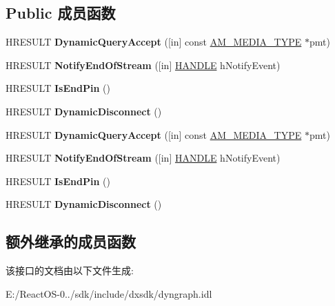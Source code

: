 \subsection*{Public 成员函数}
\begin{DoxyCompactItemize}
\item 
\mbox{\label{interface_i_pin_connection_a6d3380d5d8083c8fb1a18a982f9366b3}} 
H\+R\+E\+S\+U\+LT {\bfseries Dynamic\+Query\+Accept} (\mbox{[}in\mbox{]} const \hyperlink{struct_a_m___m_e_d_i_a___t_y_p_e}{A\+M\+\_\+\+M\+E\+D\+I\+A\+\_\+\+T\+Y\+PE} $\ast$pmt)
\item 
\mbox{\label{interface_i_pin_connection_a7b9327032b63d9bdbf1839c403e16df8}} 
H\+R\+E\+S\+U\+LT {\bfseries Notify\+End\+Of\+Stream} (\mbox{[}in\mbox{]} \hyperlink{interfacevoid}{H\+A\+N\+D\+LE} h\+Notify\+Event)
\item 
\mbox{\label{interface_i_pin_connection_ad7b486bd921783895dc0b2b6c9a68c69}} 
H\+R\+E\+S\+U\+LT {\bfseries Is\+End\+Pin} ()
\item 
\mbox{\label{interface_i_pin_connection_a5642e207868189ad22cd5d28dd888891}} 
H\+R\+E\+S\+U\+LT {\bfseries Dynamic\+Disconnect} ()
\item 
\mbox{\label{interface_i_pin_connection_a6d3380d5d8083c8fb1a18a982f9366b3}} 
H\+R\+E\+S\+U\+LT {\bfseries Dynamic\+Query\+Accept} (\mbox{[}in\mbox{]} const \hyperlink{struct_a_m___m_e_d_i_a___t_y_p_e}{A\+M\+\_\+\+M\+E\+D\+I\+A\+\_\+\+T\+Y\+PE} $\ast$pmt)
\item 
\mbox{\label{interface_i_pin_connection_a7b9327032b63d9bdbf1839c403e16df8}} 
H\+R\+E\+S\+U\+LT {\bfseries Notify\+End\+Of\+Stream} (\mbox{[}in\mbox{]} \hyperlink{interfacevoid}{H\+A\+N\+D\+LE} h\+Notify\+Event)
\item 
\mbox{\label{interface_i_pin_connection_ad7b486bd921783895dc0b2b6c9a68c69}} 
H\+R\+E\+S\+U\+LT {\bfseries Is\+End\+Pin} ()
\item 
\mbox{\label{interface_i_pin_connection_a5642e207868189ad22cd5d28dd888891}} 
H\+R\+E\+S\+U\+LT {\bfseries Dynamic\+Disconnect} ()
\end{DoxyCompactItemize}
\subsection*{额外继承的成员函数}


该接口的文档由以下文件生成\+:\begin{DoxyCompactItemize}
\item 
E\+:/\+React\+O\+S-\/0../sdk/include/dxsdk/dyngraph.\+idl\end{DoxyCompactItemize}
